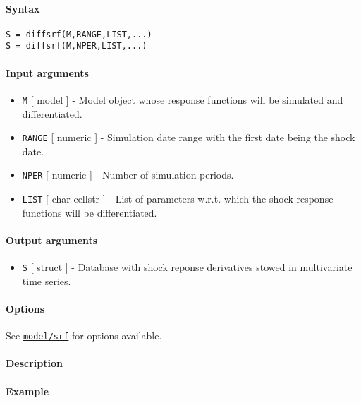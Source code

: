 


	\paragraph{Syntax}\label{syntax}

\begin{verbatim}
S = diffsrf(M,RANGE,LIST,...)
S = diffsrf(M,NPER,LIST,...)
\end{verbatim}

\paragraph{Input arguments}\label{input-arguments}

\begin{itemize}
\item
  \texttt{M} {[} model {]} - Model object whose response functions will
  be simulated and differentiated.
\item
  \texttt{RANGE} {[} numeric {]} - Simulation date range with the first
  date being the shock date.
\item
  \texttt{NPER} {[} numeric {]} - Number of simulation periods.
\item
  \texttt{LIST} {[} char \textbar{} cellstr {]} - List of parameters
  w.r.t. which the shock response functions will be differentiated.
\end{itemize}

\paragraph{Output arguments}\label{output-arguments}

\begin{itemize}
\itemsep1pt\parskip0pt
\item
  \texttt{S} {[} struct {]} - Database with shock reponse derivatives
  stowed in multivariate time series.
\end{itemize}

\paragraph{Options}\label{options}

See \href{model/srf}{\texttt{model/srf}} for options available.

\paragraph{Description}\label{description}

\paragraph{Example}\label{example}


